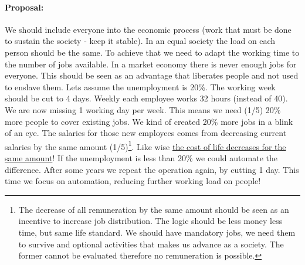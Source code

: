 \documentclass{article}
\begin{document}
\paragraph{Proposal:}
We should include everyone into the economic process (work that must be done to sustain the society - keep it stable).
In an equal society the load on each person should be the same.
To achieve that we need to adapt the working time to the number of jobs available.
In a market economy there is never enough jobs for everyone.
This should be seen as an advantage that liberates people and not used to enslave them.
Lets assume the unemployment is 20\%.
The working week should be cut to 4 days.
Weekly each employee works 32 hours (instead of 40).
We are now missing 1 working day per week.
This means we need (1/5) 20\% more people to cover existing jobs.
We kind of created 20\% more jobs in a blink of an eye.
The salaries for those new employees comes from decreasing current salaries by the same amount (1/5)\footnote{The decrease of all remuneration by the same amount should be seen as an incentive to increase job distribution. The logic should be less money less time, but same life standard. We should have mandatory jobs, we need them to survive and optional activities that makes us advance as a society. The former cannot be evaluated therefore no remuneration is possible.}.
Like wise \underline{the cost of life decreases for the same amount}!
If the unemployment is less than 20\% we could automate the difference.
After some years we repeat the operation again, by cutting 1 day.
This time we focus on automation, reducing further working load on people!
\end{document}
